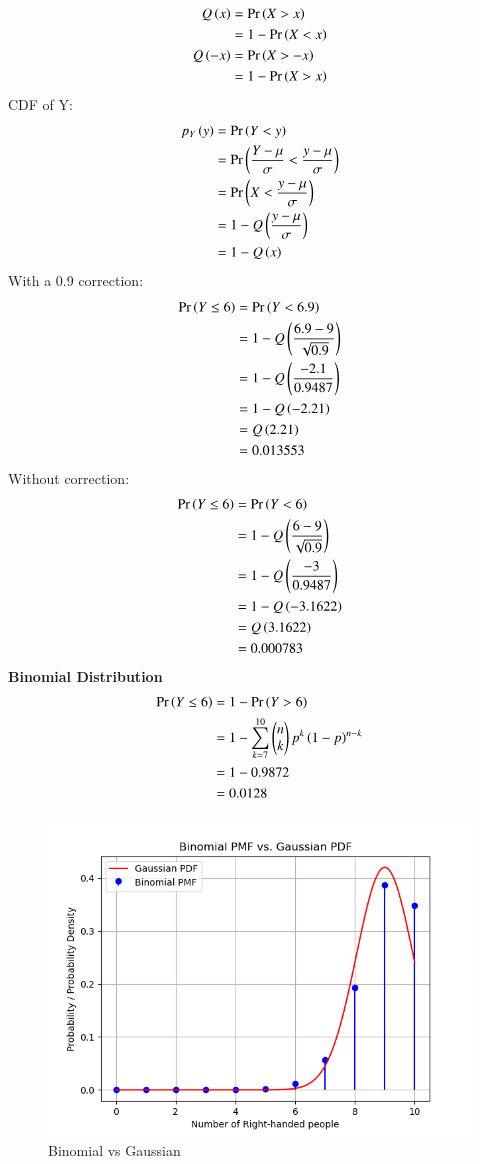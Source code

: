 \documentclass[journal,12pt,onecolumn]{IEEEtran}
\begin{document}
\begin{align}
Q\left(x\right) &= \Pr\left(X > x\right)\\
&= 1 - \Pr\left(X < x\right)\\
Q\left(-x\right) &= \Pr\left(X > -x\right)\\
&= 1 - \Pr\left(X > x\right)
\end{align}
CDF of Y:
\begin{align}
p_{Y}\left(y\right) &= \Pr\left(Y < y\right)\\
&= \Pr\left(\frac{Y - \mu}{\sigma} < \frac{y - \mu}{\sigma}\right)\\
&= \Pr\left(X < \frac{y - \mu}{\sigma}\right)\\
&= 1 - Q\left(\frac{y - \mu}{\sigma}\right)\\
&= 1 - Q\left(x\right)
\end{align}
With a 0.9 correction:
\begin{align}
\Pr\left(Y \leq 6\right) &= \Pr\left(Y < 6.9\right)\\
&= 1 - Q\left(\frac{6.9 - 9}{\sqrt{0.9}}\right)\\
&= 1 - Q\left(\frac{-2.1}{0.9487}\right)\\
&= 1 - Q\left(-2.21\right)\\
&= Q\left(2.21\right)\\
&= 0.013553
\end{align}
Without correction:
\begin{align}
\Pr\left(Y \leq 6\right) &= \Pr\left(Y < 6\right)\\
&= 1 - Q\left(\frac{6 - 9}{\sqrt{0.9}}\right)\\
&= 1 - Q\left(\frac{-3}{0.9487}\right)\\
&= 1 - Q\left(-3.1622\right)\\
&= Q\left(3.1622\right)\\
&= 0.000783
\end{align}
\textbf{Binomial Distribution}
\begin{align}
\Pr\left(Y \leq 6\right) &= 1 - \Pr\left(Y > 6\right) \\
&= 1 - \sum_{k=7}^{10}\begin{pmatrix}n\\k\end{pmatrix}p^k\left(1-p\right)^{n-k} \\
&= 1 - 0.9872\\
&= 0.0128
\end{align}
\begin{figure}[H]
\centering
\includegraphics[width=\columnwidth]{./figs/fig.png}
\caption{Binomial vs Gaussian}
\label{fig:BvG_py}
\end{figure}
\end{document}
